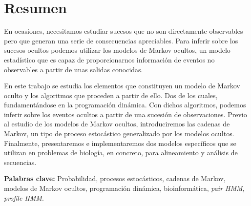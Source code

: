 \chapter*{Resumen}
En ocasiones, necesitamos estudiar sucesos que no son directamente observables pero que generan una serie de consecuencias apreciables. Para inferir sobre los sucesos ocultos podemos utilizar los modelos de Markov ocultos, un modelo estadístico que es capaz de proporcionarnos información de eventos no observables a partir de unas salidas conocidas. 

En este trabajo se estudia los elementos que constituyen un modelo de Markov oculto y los algoritmos que proceden a partir de ello. Dos de los cuales, fundamentándose en la  programación dinámica. Con dichos algoritmos, podemos inferir sobre los eventos ocultos a partir de una sucesión de observaciones. Previo al estudio de los modelos de Markov ocultos, introduciremos las cadenas de Markov, un tipo de proceso estocástico generalizado por los modelos ocultos. Finalmente, presentaremos e implementaremos dos modelos específicos que se utilizan en problemas de biología, en concreto, para alineamiento y análisis de secuencias.

\textbf{Palabras clave: } Probabilidad, procesos estocásticos, cadenas de Markov, modelos de Markov ocultos, programación dinámica, bioinformática, \textit{pair HMM}, \textit{profile HMM}.